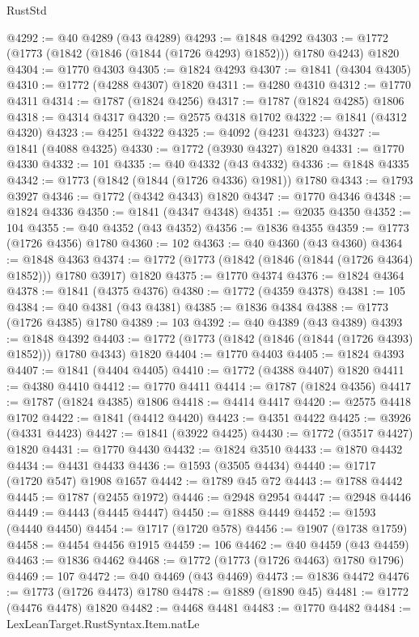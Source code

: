 \begin{lexlean}{RustStd}
\begin{coremodule}
@4292 := @40 @4289 (@43 @4289)
@4293 := @1848 @4292
@4303 := @1772 (@1773 (@1842 (@1846 (@1844 (@1726 @4293) @1852))) @1780 @4243) @1820
@4304 := @1770 @4303
@4305 := @1824 @4293
@4307 := @1841 (@4304 @4305)
@4310 := @1772 (@4288 @4307) @1820
@4311 := @4280 @4310
@4312 := @1770 @4311
@4314 := @1787 (@1824 @4256)
@4317 := @1787 (@1824 @4285) @1806
@4318 := @4314 @4317
@4320 := @2575 @4318 @1702
@4322 := @1841 (@4312 @4320)
@4323 := @4251 @4322
@4325 := @4092 (@4231 @4323)
@4327 := @1841 (@4088 @4325)
@4330 := @1772 (@3930 @4327) @1820
@4331 := @1770 @4330
@4332 := 101
@4335 := @40 @4332 (@43 @4332)
@4336 := @1848 @4335
@4342 := @1773 (@1842 (@1844 (@1726 @4336) @1981)) @1780
@4343 := @1793 @3927
@4346 := @1772 (@4342 @4343) @1820
@4347 := @1770 @4346
@4348 := @1824 @4336
@4350 := @1841 (@4347 @4348)
@4351 := @2035 @4350
@4352 := 104
@4355 := @40 @4352 (@43 @4352)
@4356 := @1836 @4355
@4359 := @1773 (@1726 @4356) @1780
@4360 := 102
@4363 := @40 @4360 (@43 @4360)
@4364 := @1848 @4363
@4374 := @1772 (@1773 (@1842 (@1846 (@1844 (@1726 @4364) @1852))) @1780 @3917) @1820
@4375 := @1770 @4374
@4376 := @1824 @4364
@4378 := @1841 (@4375 @4376)
@4380 := @1772 (@4359 @4378)
@4381 := 105
@4384 := @40 @4381 (@43 @4381)
@4385 := @1836 @4384
@4388 := @1773 (@1726 @4385) @1780
@4389 := 103
@4392 := @40 @4389 (@43 @4389)
@4393 := @1848 @4392
@4403 := @1772 (@1773 (@1842 (@1846 (@1844 (@1726 @4393) @1852))) @1780 @4343) @1820
@4404 := @1770 @4403
@4405 := @1824 @4393
@4407 := @1841 (@4404 @4405)
@4410 := @1772 (@4388 @4407) @1820
@4411 := @4380 @4410
@4412 := @1770 @4411
@4414 := @1787 (@1824 @4356)
@4417 := @1787 (@1824 @4385) @1806
@4418 := @4414 @4417
@4420 := @2575 @4418 @1702
@4422 := @1841 (@4412 @4420)
@4423 := @4351 @4422
@4425 := @3926 (@4331 @4423)
@4427 := @1841 (@3922 @4425)
@4430 := @1772 (@3517 @4427) @1820
@4431 := @1770 @4430
@4432 := @1824 @3510
@4433 := @1870 @4432
@4434 := @4431 @4433
@4436 := @1593 (@3505 @4434)
@4440 := @1717 (@1720 @547) @1908 @1657
@4442 := @1789 @45 @72
@4443 := @1788 @4442
@4445 := @1787 (@2455 @1972)
@4446 := @2948 @2954
@4447 := @2948 @4446
@4449 := @4443 (@4445 @4447)
@4450 := @1888 @4449
@4452 := @1593 (@4440 @4450)
@4454 := @1717 (@1720 @578)
@4456 := @1907 (@1738 @1759)
@4458 := @4454 @4456 @1915
@4459 := 106
@4462 := @40 @4459 (@43 @4459)
@4463 := @1836 @4462
@4468 := @1772 (@1773 (@1726 @4463) @1780 @1796)
@4469 := 107
@4472 := @40 @4469 (@43 @4469)
@4473 := @1836 @4472
@4476 := @1773 (@1726 @4473) @1780
@4478 := @1889 (@1890 @45)
@4481 := @1772 (@4476 @4478) @1820
@4482 := @4468 @4481
@4483 := @1770 @4482
@4484 := LexLeanTarget.RustSyntax.Item.natLe

\end{coremodule}
\end{lexlean}
